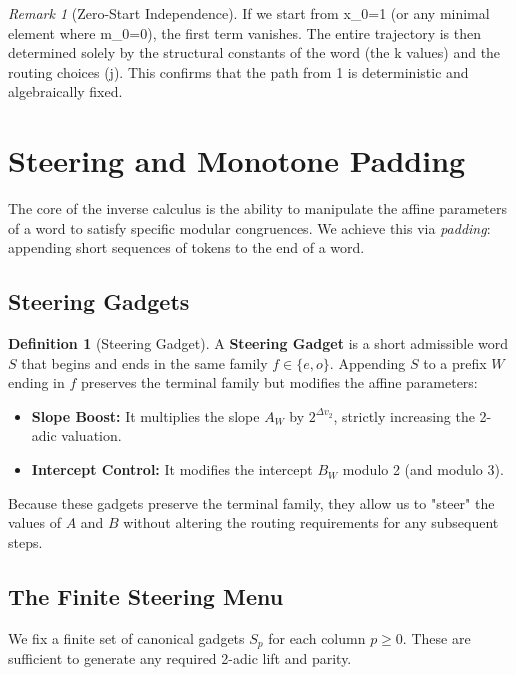 \documentclass[11pt,letterpaper]{amsart}
\def\mathrm#1{#1}%
\def\mathcal#1{#1}%
\def\({}%
\def\){}%
\theoremstyle{definition}
\newtheorem{definition}{Definition}
\theoremstyle{plain}
\theoremstyle{plain}
\theoremstyle{remark}
\newtheorem*{remark}{Remark}
\begin{document}
\begin{remark}[Zero-Start Independence]
If we start from \(x_0=1\) (or any minimal element where \(m_0=0\)), the first term vanishes. The entire trajectory is then determined solely by the structural constants of the word (the \(k\) values) and the routing choices (\(j\)). This confirms that the path from 1 is deterministic and algebraically fixed.
\end{remark}


\section{Steering and Monotone Padding}
\label{sec:steering}

The core of the inverse calculus is the ability to manipulate the affine parameters of a word to satisfy specific modular congruences. We achieve this via \emph{padding}: appending short sequences of tokens to the end of a word.

\subsection{Steering Gadgets}
\begin{definition}[Steering Gadget]
A \textbf{Steering Gadget} is a short admissible word $S$ that begins and ends in the same family $f \in \{\mathrm{e}, \mathrm{o}\}$. Appending $S$ to a prefix $W$ ending in $f$ preserves the terminal family but modifies the affine parameters:
\begin{itemize}
    \item \textbf{Slope Boost:} It multiplies the slope $A_W$ by $2^{\Delta v_2}$, strictly increasing the 2-adic valuation.
    \item \textbf{Intercept Control:} It modifies the intercept $B_W$ modulo 2 (and modulo 3).
\end{itemize}
\end{definition}

Because these gadgets preserve the terminal family, they allow us to "steer" the values of $A$ and $B$ without altering the routing requirements for any subsequent steps.

\subsection{The Finite Steering Menu}
We fix a finite set of canonical gadgets $\mathcal{S}_p$ for each column $p \ge 0$. These are sufficient to generate any required 2-adic lift and parity.
\end{document}
